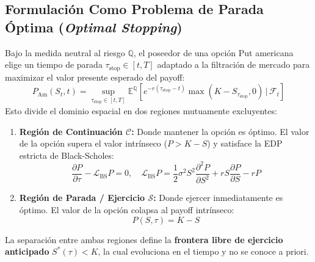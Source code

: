 \documentclass[11pt,a4paper]{article}
\begin{document}
\subsection{Formulación Como Problema de Parada Óptima (\textit{Optimal Stopping})}
Bajo la medida neutral al riesgo $\mathbb{Q}$, el poseedor de una opción Put americana elige un tiempo de parada $\tau_{\text{stop}} \in [t, T]$ adaptado a la filtración de mercado para maximizar el valor presente esperado del payoff:
\begin{equation}
    P_{\text{Am}}(S_t, t) = \sup_{\tau_{\text{stop}} \in [t, T]} \mathbb{E}^{\mathbb{Q}} \left[ e^{-r(\tau_{\text{stop}} - t)} \max(K - S_{\tau_{\text{stop}}}, 0) \,\Big|\, \mathcal{F}_t \right]
\end{equation}
Esto divide el dominio espacial en dos regiones mutuamente excluyentes:
\begin{enumerate}
    \item \textbf{Región de Continuación $\mathcal{C}$:} Donde mantener la opción es óptimo. El valor de la opción supera el valor intrínseco ($P > K - S$) y satisface la EDP estricta de Black-Scholes:
    \begin{equation}
        \frac{\partial P}{\partial \tau} - \mathcal{L}_{\text{BS}} P = 0, \quad \mathcal{L}_{\text{BS}} P = \frac{1}{2} \sigma^2 S^2 \frac{\partial^2 P}{\partial S^2} + r S \frac{\partial P}{\partial S} - r P
    \end{equation}
    \item \textbf{Región de Parada / Ejercicio $\mathcal{S}$:} Donde ejercer inmediatamente es óptimo. El valor de la opción colapsa al payoff intrínseco:
    \begin{equation}
        P(S, \tau) = K - S
    \end{equation}
\end{enumerate}
La separación entre ambas regiones define la \textbf{frontera libre de ejercicio anticipado} $S^*(\tau) < K$, la cual evoluciona en el tiempo y no se conoce a priori.
\end{document}
